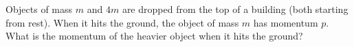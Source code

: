 Objects of mass $m$ and $4m$ are dropped
from the top of a building (both starting from rest). When it hits
the ground, the object of mass $m$ has momentum $p$. What is the
momentum of the heavier object when it hits the ground?
